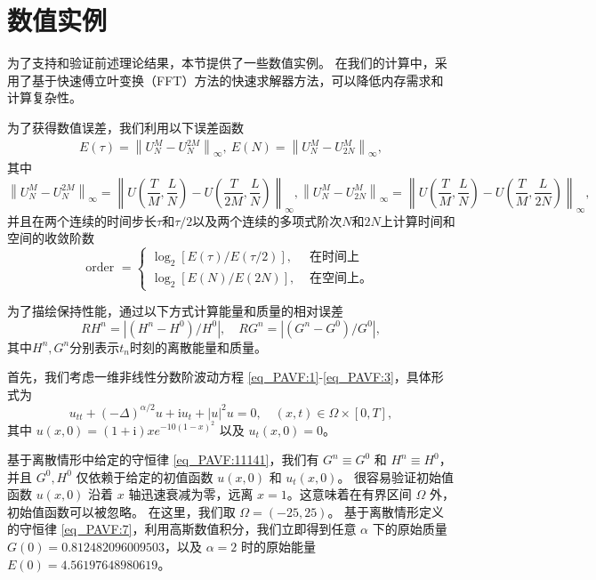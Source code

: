 \section{数值实例}\label{Section_PAVF: 4}
为了支持和验证前述理论结果，本节提供了一些数值实例。
在我们的计算中，采用了基于快速傅立叶变换（FFT）方法的快速求解器方法，可以降低内存需求和计算复杂性。

为了获得数值误差，我们利用以下误差函数
\begin{align}\label{eq_PAVF:103}
E(\tau)=\left\|U_{N}^{M}-U_{N}^{2 M}\right\|_{\infty},~E(N)=\left\|U_{N}^{M}-U_{2 N}^{M}\right\|_{\infty},
\end{align}
其中
$$\left\|U_{N}^{M}-U_{N}^{2 M}\right\|_{\infty}=\left\|U\left(\frac{T}{M}, \frac{L}{N}\right)-U\left(\frac{T}{2 M}, \frac{L}{N}\right)\right\|_{\infty},\left\|U_{N}^{M}-U_{2 N}^{M}\right\|_{\infty}=\left\|U\left(\frac{T}{M}, \frac{L}{N}\right)-U\left(\frac{T}{M}, \frac{L}{2 N}\right)\right\|_{\infty},$$
并且在两个连续的时间步长$\tau$和$\tau / 2$以及两个连续的多项式阶次$N$和$2N$上计算时间和空间的收敛阶数
\begin{equation}
\text { order }= \left\{
\begin{aligned}
\log _{2}[E(\tau) / E(\tau / 2)], & \text { 在时间上 } \\
\log _{2}[E(N) / E(2 N)], & \text { 在空间上。 }
\end{aligned}\right.\label{eq_PAVF:104}
\end{equation}

为了描绘保持性能，通过以下方式计算能量和质量的相对误差
\begin{equation}\label{eq_PAVF:105}
R H^{n}=\left|\left(H^{n}-H^{0}\right) / H^{0}\right|, \quad R G^{n}=\left|\left(G^{n}-G^{0}\right) / G^{0}\right|,
\end{equation}
其中$H^{n}, G^{n}$分别表示$t_n$时刻的离散能量和质量。

\begin{example}\label{exp_PAVF:2}
	首先，我们考虑一维非线性分数阶波动方程 \eqref{eq_PAVF:1}-\eqref{eq_PAVF:3}，具体形式为
	\begin{equation}\label{eq_PAVF:108}
	u_{t t}+(-\Delta)^{\alpha / 2} u+\mathrm{i}u_t+|u|^2 u=0, \quad (x,t)\in  \Omega\times[0, T],
	\end{equation}
	其中 $u(x, 0)=(1+\mathrm{i}) x e^{-10(1-x)^2}$ 以及 $u_t(x, 0)=0$。
\end{example}
	基于离散情形中给定的守恒律 \eqref{eq_PAVF:11141}，我们有 $G^n\equiv G^0$ 和 $H^n\equiv H^0$，并且 $G^0, H^0$ 仅依赖于给定的初值函数 $u(x,0)$ 和 $u_t(x, 0)$。
	很容易验证初始值函数 $u(x, 0)$ 沿着 $x$ 轴迅速衰减为零，远离 $x=1$。这意味着在有界区间 $\Omega$ 外，初始值函数可以被忽略。 %
	在这里，我们取 $\Omega=(-25,25)$。
	基于离散情形定义的守恒律 \eqref{eq_PAVF:7}，利用高斯数值积分，我们立即得到任意 $\alpha$ 下的原始质量 $G(0)=0.812482096009503$，以及 $\alpha=2$ 时的原始能量 $E(0)=4.56197648980619$。
	
